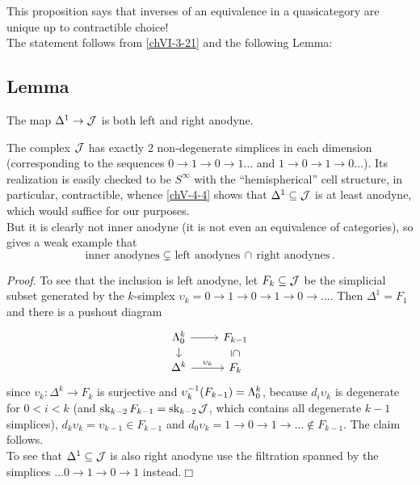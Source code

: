         This proposition says that inverses of an equivalence in a quasicategory are unique up to contractible choice!\\
        The statement follows from \ref{chVI-3-21} and the following Lemma:

    \subsection{Lemma}\label{chVI-3-25}
        The map $\Delta^1 \to \mathcal{J}$ is both left and right anodyne.
        \medskip

        The complex $\mathcal{J}$ has exactly 2 non-degenerate simplices in each dimension (corresponding to the sequences $0 \to 1 \to 0 \to 1 \ldots$ and $1 \to 0 \to 1 \to 0 \ldots$). Its realization is easily checked to be $S^{\infty}$ with the ``hemispherical'' cell structure, in particular, contractible, whence \ref{chV-4-4} shows that $\Delta^1 \subseteq \mathcal{J}$ is at least anodyne, which would suffice for our purposes.\\
        But it is clearly not inner anodyne (it is not even an equivalence of categories), so gives a weak example that
        \begin{equation*}
            \text{inner anodynes} \subsetneq \text{left anodynes} \,\cap\, \text{right anodynes} \,.
        \end{equation*}

        \emph{Proof}. To see that the inclusion is left anodyne, let $F_k \subseteq \mathcal{J}$ be the simplicial subset generated by the $k$-simplex $\upsilon_k = 0 \to 1 \to 0 \to 1 \to 0 \to \ldots$. Then $\Delta^1 = F_1$ and there is a pushout diagram
        \begin{equation*}
            \begin{tikzcd}[row sep=small]
                \horn{k}{0} \arrow[d] \arrow[r] & F_{k-1} \arrow[d, phantom, "\subseteq" rotate=-90] \\
                \Delta^k \arrow[r, "\upsilon_k"] & F_k
            \end{tikzcd}
        \end{equation*}
        since $v_k \colon \Delta^k \to F_k$ is surjective and $\upsilon_k^{-1}(F_{k-1}) = \Lambda^{k}_{0}$, because $d_i \upsilon_k$ is degenerate for $0 < i < k$ (and $\operatorname{sk}_{k-2} F_{k-1} = \operatorname{sk}_{k-2} \mathcal{J}$, which contains all degenerate $k-1$ simplices), $d_k \upsilon_k = \upsilon_{k-1} \in F_{k-1}$ and $d_0 \upsilon_k = 1 \to 0 \to 1 \to \ldots \notin F_{k-1}$. The claim follows.\\
        To see that $\Delta^1 \subseteq \mathcal{J}$ is also right anodyne use the filtration spanned by the simplices $\ldots 0 \to 1 \to 0 \to 1$ instead.\hfill$\Box$
        \medskip

